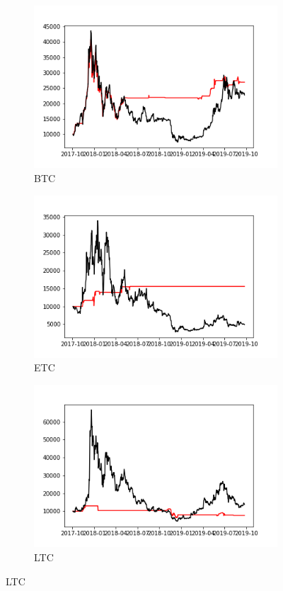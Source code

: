 \documentclass[letterpaper]{article}
\begin{document}
\begin{figure}[H]
\begin{subfigure}[b]{0.4\linewidth}
    \end{subfigure}
    \begin{subfigure}[b]{0.4\linewidth}
        \includegraphics[width=\linewidth]{images/portfolio/BTC.png}
        \caption{BTC}
      \end{subfigure}
      \begin{subfigure}[b]{0.4\linewidth}
        \includegraphics[width=\linewidth]{images/portfolio/ETC.png}
        \caption{ETC}
    \end{subfigure}
    \begin{subfigure}[b]{0.4\linewidth}
        \includegraphics[width=\linewidth]{images/portfolio/LTC.png}
        \caption{LTC}
    \end{subfigure}


\end{figure}
\end{document}
